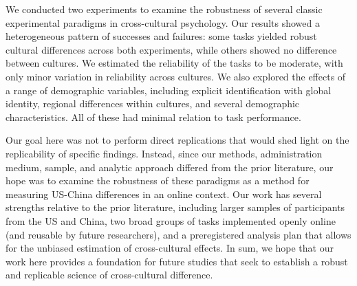 \documentclass[
  man,floatsintext]{apa6}
\begin{document}
We conducted two experiments to examine the robustness of several classic experimental paradigms in cross-cultural psychology. Our results showed a heterogeneous pattern of successes and failures: some tasks yielded robust cultural differences across both experiments, while others showed no difference between cultures. We estimated the reliability of the tasks to be moderate, with only minor variation in reliability across cultures. We also explored the effects of a range of demographic variables, including explicit identification with global identity, regional differences within cultures, and several demographic characteristics. All of these had minimal relation to task performance.

Our goal here was not to perform direct replications that would shed light on the replicability of specific findings. Instead, since our methods, administration medium, sample, and analytic approach differed from the prior literature, our hope was to examine the robustness of these paradigms as a method for measuring US-China differences in an online context. Our work has several strengths relative to the prior literature, including larger samples of participants from the US and China, two broad groups of tasks implemented openly online (and reusable by future researchers), and a preregistered analysis plan that allows for the unbiased estimation of cross-cultural effects. In sum, we hope that our work here provides a foundation for future studies that seek to establish a robust and replicable science of cross-cultural difference.
\end{document}
